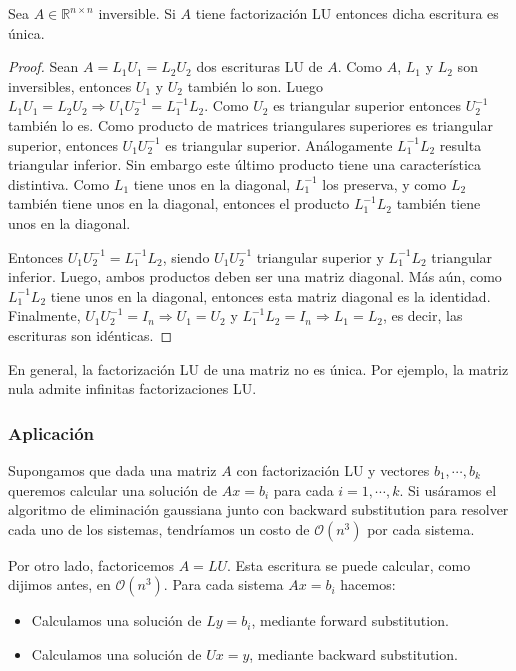 \begin{propo}
Sea $A \in \mathbb{R}^{n \times n}$ inversible. Si $A$ tiene factorización LU entonces dicha escritura es única.

\begin{proof}
Sean $A = L_1 U_1 = L_2 U_2$ dos escrituras LU de $A$. Como $A$, $L_1$ y $L_2$ son inversibles, entonces $U_1$ y $U_2$ también lo son. Luego $L_1 U_1 = L_2 U_2 \Rightarrow U_1 U_2^{-1} = L_1^{-1} L_2$. Como $U_2$ es triangular superior entonces $U_2^{-1}$ también lo es. Como producto de matrices triangulares superiores es triangular superior, entonces $U_1 U_2^{-1}$ es triangular superior. Análogamente $L_1^{-1} L_2$ resulta triangular inferior. Sin embargo este último producto tiene una característica distintiva. Como $L_1$ tiene unos en la diagonal, $L_1^{-1}$ los preserva, y como $L_2$ también tiene unos en la diagonal, entonces el producto $L_1^{-1} L_2$ también tiene unos en la diagonal.

Entonces $U_1 U_2^{-1} = L_1^{-1} L_2$, siendo $U_1 U_2^{-1}$ triangular superior y $L_1^{-1} L_2$ triangular inferior. Luego, ambos productos deben ser una matriz diagonal. Más aún, como $L_1^{-1} L_2$ tiene unos en la diagonal, entonces esta matriz diagonal es la identidad. Finalmente, $U_1 U_2^{-1} = I_n \Rightarrow U_1 = U_2$ y $L_1^{-1}L_2 = I_n \Rightarrow L_1 = L_2$, es decir, las escrituras son idénticas.

\end{proof}
\end{propo}

\begin{obs}
En general, la factorización LU de una matriz no es única. Por ejemplo, la matriz nula admite infinitas factorizaciones LU.
\end{obs}



\subsubsection{Aplicación}
Supongamos que dada una matriz $A$ con factorización LU y vectores $b_1, \cdots, b_k$ queremos calcular una solución de $Ax = b_i$ para cada $i = 1, \cdots, k$. Si usáramos el algoritmo de eliminación gaussiana junto con backward substitution para resolver cada uno de los sistemas, tendríamos un costo de $\mathcal{O}(n^3)$ por cada sistema.

Por otro lado, factoricemos $A = LU$. Esta escritura se puede calcular, como dijimos antes, en $\mathcal{O}(n^3)$. Para cada sistema $Ax = b_i$ hacemos:
\begin{itemize}
\item Calculamos una solución de $Ly = b_i$, mediante forward substitution.
\item Calculamos una solución de $Ux = y$, mediante backward substitution.
\end{itemize}

